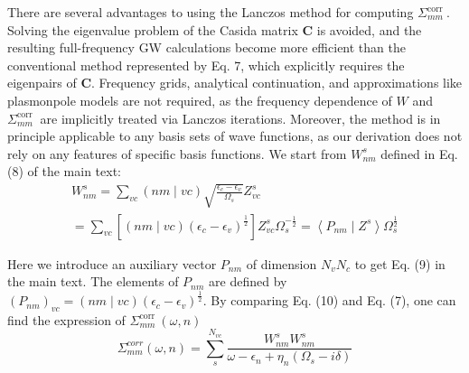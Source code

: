 There are several advantages to using the Lanczos method for computing $\Sigma_{m m}^{\text {corr }}$. Solving the eigenvalue problem of the Casida matrix $\mathbf{C}$ is avoided, and the resulting full-frequency GW calculations become more efficient than the conventional method represented by Eq. 7, which explicitly requires the eigenpairs of $\mathbf{C}$. Frequency grids, analytical continuation, and approximations like plasmonpole models are not required, as the frequency dependence of $W$ and $\Sigma_{m m}^{\text {corr }}$ are implicitly treated via Lanczos iterations. Moreover, the method is in principle applicable to any basis sets of wave functions, as our derivation does not rely on any features of specific basis functions.
We start from $W_{n m}^s$ defined in Eq. (8) of the main text:
$$
\begin{gathered}
W_{n m}^s=\sum_{v c}(n m \mid v c) \sqrt{\frac{\epsilon_c-\epsilon_v}{\Omega_s}} Z_{v c}^s \\
=\sum_{v c}\left[(n m \mid v c)\left(\epsilon_c-\epsilon_v\right)^{\frac{1}{2}}\right] Z_{v c}^s \Omega_s^{-\frac{1}{2}}=\left\langle P_{n m} \mid Z^s\right\rangle \Omega_s^{\frac{1}{2}}
\end{gathered}
$$

Here we introduce an auxiliary vector $P_{n m}$ of dimension $N_v N_c$ to get Eq. (9) in the main text. The elements of $P_{n m}$ are defined by $\left(P_{n m}\right)_{v c}=(n m \mid v c)\left(\epsilon_c-\epsilon_v\right)^{\frac{1}{2}}$. By comparing Eq. (10) and Eq. (7), one can find the expression of $\Sigma_{m m}^{\text {corr }}(\omega, n)$
$$
\Sigma_{m m}^{c o r r}(\omega, n)=\sum_s^{N_{v c}} \frac{W_{n m}^s W_{n m}^s}{\omega-\epsilon_n+\eta_n\left(\Omega_s-i \delta\right)}
$$

